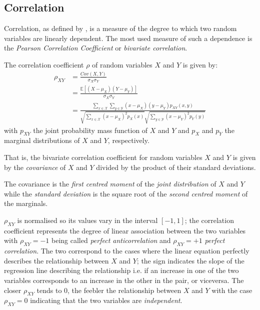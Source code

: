 \subsection{Correlation} \label{subsec:correlation}
Correlation, as defined by \cite{Stolp2006}, is a measure of the degree to which two random variables are linearly dependent.
The most used measure of such a dependence is the \textit{Pearson Correlation Coefficient} or \textit{bivariate correlation}.
\begin{definition}
	The correlation coefficient $\rho$ of random variables $X$ and $Y$ is given by:
	\begin{align} \label{eq:correlation}
		\rho_{XY} &= \frac{Cov(X,Y)}{\sigma_X \sigma_Y} \\
		&= \frac{\mathbb{E}[ (X - \mu_X) (Y - \mu_Y) ]}{\sigma_X \sigma_Y} \\
		&= \frac{\sum_{x \in \mathcal{X}} \sum_{y \in \mathcal{Y}} (x - \mu_X) (y - \mu_Y) p_{XY}(x,y)}{ \sqrt{\sum_{x \in \mathcal{X}}  (x - \mu_X)^2 p_X(x)} \sqrt{\sum_{y \in \mathcal{Y}} (x - \mu_Y)^2 p_Y(y)} } 
	\end{align}
	with $p_{XY}$ the joint probability mass function of $X$ and $Y$ and $p_{X}$ and $p_{Y}$ the marginal distributions of $X$ and $Y$, respectively.
\end{definition}
That is, the bivariate correlation coefficient for random variables $X$ and $Y$ is given by the \textit{covariance} of $X$ and $Y$ divided by the product of their standard deviations.

The covariance is the \textit{first centred moment} of the \textit{joint distribution} of $X$ and $Y$ while the \textit{standard deviation} is the square root of the \textit{second centred moment} of the marginals.

$\rho_{XY}$ is normalised so its values vary in the interval $[-1,1]$; the correlation coefficient represents the degree of linear association between the two variables with $\rho_{XY}=-1$ being called \textit{perfect anticorrelation} and $\rho_{XY}=+1$ \textit{perfect correlation}.
The two correspond to the cases where the linear equation perfectly describes the relationship between $X$ and $Y$; the sign indicates the slope of the regression line describing the relationship i.e. if an increase in one of the two variables corresponds to an increase in the other in the pair, or viceversa.
The closer $\rho_{XY}$ tends to $0$, the feebler the relationship between $X$ and $Y$ with the case $\rho_{XY}=0$ indicating that the two variables are \textit{independent}.

